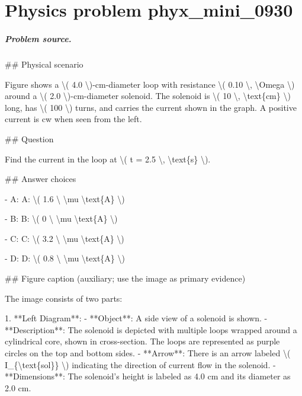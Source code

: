 
\chapter{Physics problem phyx\_mini\_0930}
\label{ch:PhyXMiniProblems_problem_phyx_mini_0930}

\paragraph{Problem source.}
\#\# Physical scenario

Figure shows a \textbackslash{}( 4.0 \textbackslash{})-cm-diameter loop with resistance \textbackslash{}( 0.10 \textbackslash{}, \textbackslash{}Omega \textbackslash{}) around a \textbackslash{}( 2.0 \textbackslash{})-cm-diameter solenoid. The solenoid is \textbackslash{}( 10 \textbackslash{}, \textbackslash{}text\{cm\} \textbackslash{}) long, has \textbackslash{}( 100 \textbackslash{}) turns, and carries the current shown in the graph. A positive current is cw when seen from the left.

\#\# Question

Find the current in the loop at \textbackslash{}( t = 2.5 \textbackslash{}, \textbackslash{}text\{s\} \textbackslash{}).

\#\# Answer choices

- A: A: \textbackslash{}( 1.6 \textbackslash{} \textbackslash{}mu \textbackslash{}text\{A\} \textbackslash{})

- B: B: \textbackslash{}( 0 \textbackslash{} \textbackslash{}mu \textbackslash{}text\{A\} \textbackslash{})

- C: C: \textbackslash{}( 3.2 \textbackslash{} \textbackslash{}mu \textbackslash{}text\{A\} \textbackslash{})

- D: D: \textbackslash{}( 0.8 \textbackslash{} \textbackslash{}mu \textbackslash{}text\{A\} \textbackslash{})

\#\# Figure caption (auxiliary; use the image as primary evidence)

The image consists of two parts:

1. **Left Diagram**: 
   - **Object**: A side view of a solenoid is shown.
   - **Description**: The solenoid is depicted with multiple loops wrapped around a cylindrical core, shown in cross-section. The loops are represented as purple circles on the top and bottom sides.
   - **Arrow**: There is an arrow labeled \textbackslash{}( I\_\{\textbackslash{}text\{sol\}\} \textbackslash{}) indicating the direction of current flow in the solenoid. 
   - **Dimensions**: The solenoid's height is labeled as 4.0 cm and its diameter as 2.0 cm.

